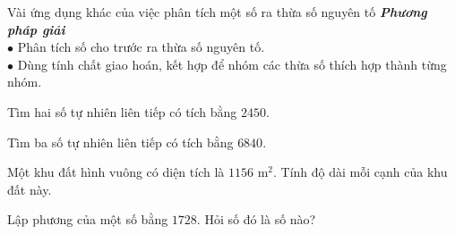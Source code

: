 \begin{dang}{Vài ứng dụng khác của việc phân tích một số ra thừa số nguyên tố}
	\textbf{\textit{Phương pháp giải}}\\
	$\bullet$ Phân tích số cho trước ra thừa số nguyên tố.\\
	$\bullet$ Dùng tính chất giao hoán, kết hợp để nhóm các thừa số thích hợp thành từng nhóm.
\end{dang}
\begin{vd}%
	Tìm hai số tự nhiên liên tiếp có tích bằng $2450$.
\end{vd}
\begin{vd}%
	Tìm ba số tự nhiên liên tiếp có tích bằng $6840$.
\end{vd}
\begin{vd}%
	Một khu đất hình vuông có diện tích là $1156$ m$^2$. Tính độ dài mỗi cạnh của khu đất này.
\end{vd}
\begin{vd}%
	Lập phương của một số bằng $1728$. Hỏi số đó là số nào?
\end{vd}
